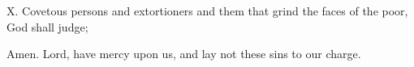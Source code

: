 X. Covetous persons and extortioners and them that grind the faces of the poor, God shall judge;

\R Amen. Lord, have mercy upon us, and lay not these sins to our charge.


\centerline{}

